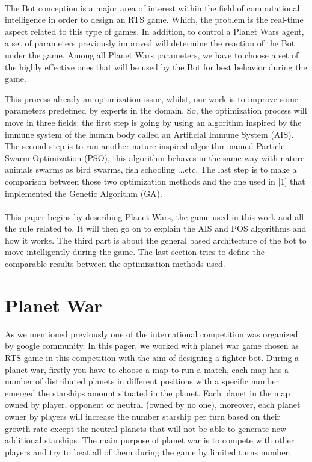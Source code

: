 \documentclass[]{interact}
\theoremstyle{plain}%
\theoremstyle{definition}
\theoremstyle{remark}
\begin{document}
\paragraph*{}
The Bot conception is a major area of interest\cite{doc4} within the field of computational intelligence in order to design an RTS game. Which, the problem is the real-time aspect related to this type of games. In addition, to control a Planet Wars agent, a set of parameters previously improved will determine the reaction of the Bot under the game. Among all Planet Wars parameters, we have to choose a set of the highly effective ones\cite{doc5} that will be used by the Bot for best behavior during the game.\par
This process already an optimization issue\cite{doc5}, whilst, our work is to improve some parameters predefined by experts in the domain. So, the optimization process will move in three fields: the first step is going by using an algorithm inspired by the immune system of the human body called an Artificial Immune System (AIS). The second step is to run another nature-inspired algorithm named Particle Swarm Optimization (PSO), this algorithm behaves in the same way with nature animals swarms as bird swarms, fish schooling ...etc. The last step is to make a comparison between those two optimization methods and the one used in [1] that implemented the Genetic Algorithm (GA).

\paragraph*{}
This paper begins by describing Planet Wars, the game used in this work and all the rule related to. It will then go on to explain the AIS and POS algorithms and how it works. The third part is about the general based architecture of the bot to move intelligently during the game. The last section tries to define the comparable results between the optimization methods used.

\section{Planet War}

As we mentioned previously one of the international competition was organized by google community. In this pager, we worked with planet war game chosen as RTS game in this competition with the aim of designing a fighter bot. During a planet war\cite{doc1}, firstly you have to choose a map to run a match, each map has a number of distributed planets in different positions with a specific number emerged the starships amount situated in the planet. Each planet in the map owned by player, opponent or neutral (owned by no one), moreover, each planet owner by players will increase the number starship per turn based on their growth rate except the neutral planets that will not be able to generate new additional starships. The main purpose of planet war\cite{doc1} is to compete with other players and try to beat all of them during the game by limited turns number.  \\
\end{document}
